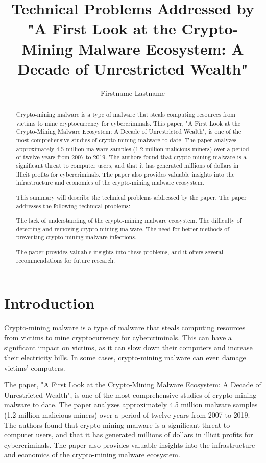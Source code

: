 \documentclass[sigconf]{acmart}
\begin{document}
\title{Technical Problems Addressed by "A First Look at the Crypto-Mining Malware Ecosystem: A Decade of Unrestricted Wealth"}

\author{Firstname Lastname}

\begin{abstract}
Crypto-mining malware is a type of malware that steals computing resources from victims to mine cryptocurrency for cybercriminals. This paper, "A First Look at the Crypto-Mining Malware Ecosystem: A Decade of Unrestricted Wealth", is one of the most comprehensive studies of crypto-mining malware to date. The paper analyzes approximately 4.5 million malware samples (1.2 million malicious miners) over a period of twelve years from 2007 to 2019. The authors found that crypto-mining malware is a significant threat to computer users, and that it has generated millions of dollars in illicit profits for cybercriminals. The paper also provides valuable insights into the infrastructure and economics of the crypto-mining malware ecosystem.

This summary will describe the technical problems addressed by the paper. The paper addresses the following technical problems:

    The lack of understanding of the crypto-mining malware ecosystem.
    The difficulty of detecting and removing crypto-mining malware.
    The need for better methods of preventing crypto-mining malware infections.

The paper provides valuable insights into these problems, and it offers several recommendations for future research.
\end{abstract}

\section{Introduction}

Crypto-mining malware is a type of malware that steals computing resources from victims to mine cryptocurrency for cybercriminals. This can have a significant impact on victims, as it can slow down their computers and increase their electricity bills. In some cases, crypto-mining malware can even damage victims' computers.

The paper, "A First Look at the Crypto-Mining Malware Ecosystem: A Decade of Unrestricted Wealth", is one of the most comprehensive studies of crypto-mining malware to date. The paper analyzes approximately 4.5 million malware samples (1.2 million malicious miners) over a period of twelve years from 2007 to 2019. The authors found that crypto-mining malware is a significant threat to computer users, and that it has generated millions of dollars in illicit profits for cybercriminals. The paper also provides valuable insights into the infrastructure and economics of the crypto-mining malware ecosystem.
\end{document}
